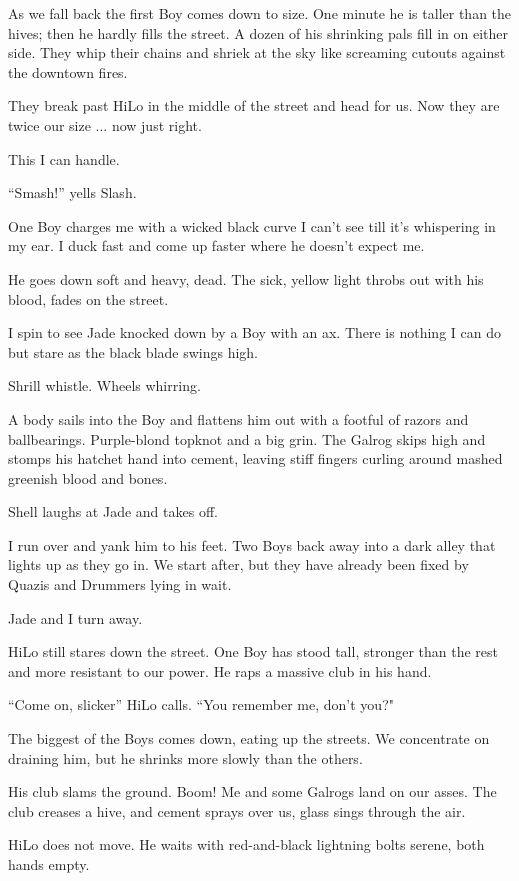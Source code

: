 As we fall back the first Boy comes down to size. One minute he is taller than the hives; then he hardly fills the street. A dozen of his shrinking pals fill in on either side. They whip their chains and shriek at the sky like screaming cutouts against the downtown fires.

They break past HiLo in the middle of the street and head for us. Now they are twice our size ... now just right.

This I can handle.

``Smash!'' yells Slash.

One Boy charges me with a wicked black curve I can't see till it's whispering in my ear. I duck fast and come up faster where he doesn't expect me.

He goes down soft and heavy, dead. The sick, yellow light throbs out with his blood, fades on the street.

I spin to see Jade knocked down by a Boy with an ax. There is nothing I can do but stare as the black blade swings high.

Shrill whistle. Wheels whirring.

A body sails into the Boy and flattens him out with a footful of razors and ballbearings. Purple-blond topknot and a big grin. The Galrog skips high and stomps his hatchet hand into cement, leaving stiff fingers curling around mashed greenish blood and bones.

Shell laughs at Jade and takes off.

I run over and yank him to his feet. Two Boys back away into a dark alley that lights up as they go in. We start after, but they have already been fixed by Quazis and Drummers lying in wait.

Jade and I turn away.

HiLo still stares down the street. One Boy has stood tall, stronger than the rest and more resistant to our power. He raps a massive club in his hand.

``Come on, slicker'' HiLo calls. ``You remember me, don't you?"

The biggest of the Boys comes down, eating up the streets. We concentrate on draining him, but he shrinks more slowly than the others.

His club slams the ground. Boom! Me and some Galrogs land on our asses. The club creases a hive, and cement sprays over us, glass sings through the air.

HiLo does not move. He waits with red-and-black lightning bolts serene, both hands empty.

